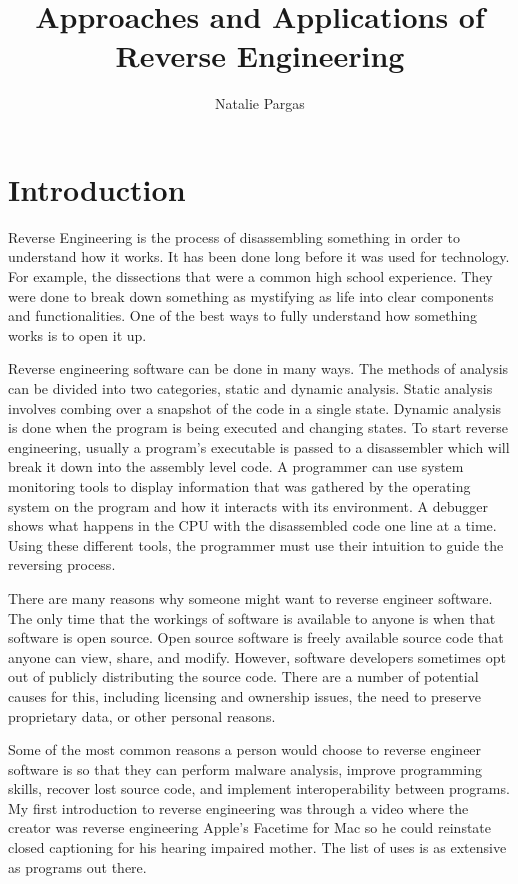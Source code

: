 \documentclass[12pt]{article}
\title{Approaches and Applications of Reverse Engineering}
\date{\vspace{-5ex}}
\author{Natalie Pargas}
\begin{document}
\maketitle

\tableofcontents
\newpage


\section{Introduction}
Reverse Engineering is the process of disassembling something in order to understand how it works. It has been done long before it was used for technology. For example, the dissections that were a common high school experience. They were done to break down something as mystifying as life into clear components and functionalities. One of the best ways to fully understand how something works is to open it up.

Reverse engineering software can be done in many ways. The methods of analysis can be divided into two categories, static and dynamic analysis. Static analysis involves combing over a snapshot of the code in a single state. Dynamic analysis is done when the program is being executed and changing states. To start reverse engineering, usually a program’s executable is passed to a disassembler which will break it down into the assembly level code. A programmer can use system monitoring tools to display information that was gathered by the operating system on the program and how it interacts with its environment. A debugger shows what happens in the CPU with the disassembled code one line at a time. Using these different tools, the programmer must use their intuition to guide the reversing process. 

There are many reasons why someone might want to reverse engineer software. The only time that the workings of software is available to anyone is when that software is open source. Open source software is freely available source code that anyone can view, share, and modify. However, software developers sometimes opt out of publicly distributing the source code. There are a number of potential causes for this, including licensing and ownership issues, the need to preserve proprietary data, or other personal reasons.

Some of the most common reasons a person would choose to reverse engineer software is so that they can perform malware analysis, improve programming skills, recover lost source code, and implement interoperability between programs. My first introduction to reverse engineering was through a video where the creator was reverse engineering Apple’s Facetime for Mac so he could reinstate closed captioning for his hearing impaired mother. The list of uses is as extensive as programs out there.
\end{document}
